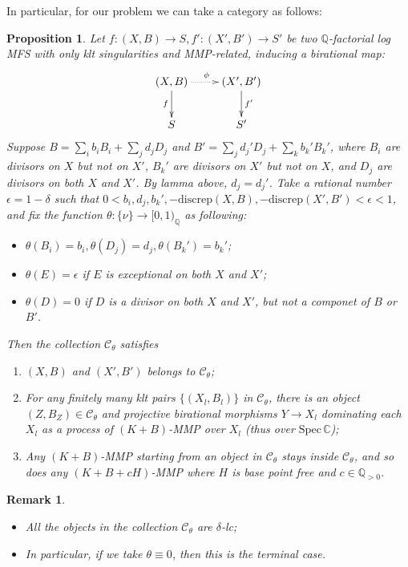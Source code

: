 \documentclass{article}
\newtheorem{prop}[defn]{Proposition}
\newtheorem{rmk}[defn]{Remark}
\begin{document}
In particular, for our problem we can take a category as follows:
\begin{prop}\label{cat}
  Let $ f:(X,B)\to S,f':(X',B')\to S' $ be two $ \mathbb{Q} $-factorial log MFS  with only klt singularities and MMP-related, inducing a birational map:
  $$ \xymatrix{
    (X,B)\ar[d]_f\ar@{.>}[r]^\phi&(X',B')\ar[d]^{f'}\\
  S&S'} $$
  Suppose  $ B=\sum_ib_iB_i+\sum_jd_jD_j $ and $ B'=\sum_jd_j'D_j+\sum_kb_k'B_k' $, where $ B_i $ are divisors on $ X $ but not on $ X' $, $ B_k' $ are divisors on $ X' $ but not on $ X $, and $ D_j $ are divisors on both $ X $ and $ X' $. By lamma above, $ d_j=d_j' $. Take a rational number $ \epsilon=1-\delta $ such that $ 0<b_i,d_j,b_k', -\mathrm{discrep}(X,B),-\mathrm{discrep}(X',B')<\epsilon<1 $, and fix the function $ \theta:\{\nu\}\to [0,1)_\mathbb{Q} $ as following:
  \begin{itemize}
    \item $ \theta(B_i)=b_i, \theta(D_j)=d_j,\theta(B_k')=b_k'$;
    \item $ \theta(E)=\epsilon $ if $ E $ is exceptional on both $ X $ and $ X' $;
    \item $ \theta(D)=0 $ if $ D $ is a divisor on both $ X $ and $ X' $, but not a componet of $ B $ or $ B' $.
  \end{itemize}
  Then the collection $ \mathcal{C}_\theta $ satisfies
\begin{enumerate}[1)]
  \item $ (X,B) $ and $ (X',B') $ belongs to $ \mathcal{C}_\theta $;
  \item For any finitely many klt pairs $ \{(X_l,B_l)\} $ in $ \mathcal{C}_\theta $, there is an object $ (Z,B_Z)\in \mathcal{C}_\theta $ and projective birational morphisms $ Y\to X_l $ dominating each  $ X_l $ as a process of $ (K+B) $-MMP over $ X_l $ (thus over $ \mathrm{Spec}\,\mathbb{C} $);
  \item Any $ (K+B) $-MMP starting from an object in $ \mathcal{C}_\theta $ stays inside $ \mathcal{C}_\theta $, and so does any $ (K+B+cH) $-MMP where $ H $ is base point free and $ c\in \mathbb{Q}_{>0} $.
\end{enumerate}
\end{prop}

\begin{rmk}
\begin{itemize}
  \item All the objects in the collection $ \mathcal{C}_\theta $ are $ \delta $-lc;
  \item In particular, if we take $ \theta\equiv 0 $, then this is the terminal case.
\end{itemize}
\end{rmk}
\end{document}
